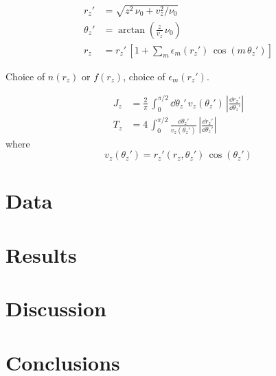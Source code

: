 \begin{align}
    r_z' &= \sqrt{z^2 \, \nu_0 + v_z^2 / \nu_0} \\
    \theta_z' &= \arctan{\left(\frac{z}{v_z} \, \nu_0 \right)} \\
    r_z &= r_z' \, \left[1 + \sum_m \epsilon_m(r_z') \, \cos{\left(m\,\theta_z'\right)}\right]
\end{align}

Choice of $n(r_z)$ or $f(r_z)$, choice of $\epsilon_m(r_z')$.

\begin{align}
    J_z &= \frac{2}{\pi} \, \int_0^{\pi/2} \dd \theta_z' \, v_z(\theta_z')
        \, \left|\frac{\dd r_z'}{\dd \theta_z'}\right| \\
    T_z &= 4 \, \int_0^{\pi/2} \frac{\dd \theta_z'}{v_z(\theta_z')}
        \, \left|\frac{\dd r_z'}{\dd \theta_z'}\right| \quad
\end{align}
where
\begin{equation}
    v_z(\theta_z') = r_z'(r_z, \theta_z') \, \cos{(\theta_z')}
\end{equation}


\section{Data} \label{sec:data}


\section{Results} \label{sec:results}


\section{Discussion} \label{sec:discussion}


\section{Conclusions} \label{sec:conclusions}


